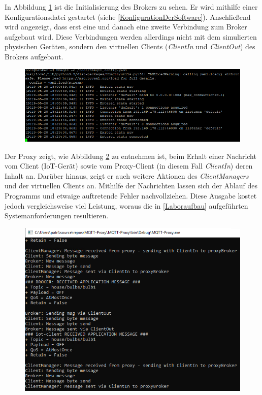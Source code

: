     In Abbildung \ref{fig:broker_connections} ist die Initialisierung des Brokers zu sehen. Er wird mithilfe einer Konfigurationsdatei gestartet (siehe \ref{KonfigurationDerSoftware}). Anschließend wird angezeigt, dass erst eine und danach eine zweite Verbindung zum Broker aufgebaut wird. Diese Verbindungen werden allerdings nicht mit dem simulierten physischen Geräten, sondern den virtuellen Clients (\emph{ClientIn} und \emph{ClientOut}) des Brokers aufgebaut.
    \begin{figure}[!h]%
        \centering
        \includegraphics[width=14cm]{tex/bilder/6_validierung/BrokerConnections.png}
        \label{fig:broker_connections}
    \end{figure}
    
    Der Proxy zeigt, wie Abbildung \ref{fig:proxy_messages} zu entnehmen ist, beim Erhalt einer Nachricht vom Client (\ac{IoT}-Gerät) sowie vom Proxy-Client (in diesem Fall \emph{ClientIn}) deren Inhalt an.
    Darüber hinaus, zeigt er auch weitere Aktionen des \emph{ClientManagers} und der virtuellen Clients an.
    Mithilfe der Nachrichten lassen sich der Ablauf des Programms und etwaige auftretende Fehler nachvollziehen. Diese Ausgabe kostet jedoch vergleichsweise viel Leistung, woraus die in \ref{Laboraufbau} aufgeführten Systemanforderungen resultieren. 
    \begin{figure}[!h]%
        \centering
        \includegraphics[width=12cm]{tex/bilder/6_validierung/ProxyMessages.png}
        \label{fig:proxy_messages}
    \end{figure}
    
